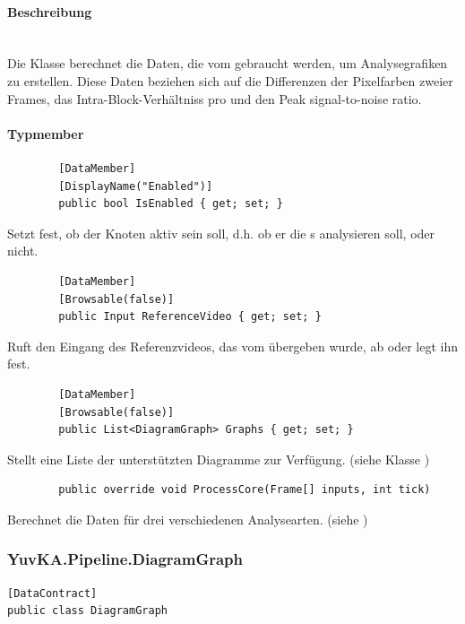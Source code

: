 \paragraph{Beschreibung}~\\
Die Klasse  berechnet die Daten, die vom  gebraucht werden, um Analysegrafiken zu erstellen. Diese Daten beziehen sich auf die Differenzen der Pixelfarben zweier Frames, das Intra-Block-Verhältniss pro  und den Peak signal-to-noise ratio.

\paragraph{Typmember}
\begin{itemize}

	\begin{verbatim}
		[DataMember]
		[DisplayName("Enabled")]
		public bool IsEnabled { get; set; }
	\end{verbatim}
	Setzt fest, ob der Knoten aktiv sein soll, d.h. ob er die s analysieren soll, oder nicht.
	
	\begin{verbatim}
		[DataMember]
		[Browsable(false)]
		public Input ReferenceVideo { get; set; }
	\end{verbatim}
	Ruft den Eingang des Referenzvideos, das vom  übergeben wurde, ab oder legt ihn fest.

	\begin{verbatim}
		[DataMember]
		[Browsable(false)]
		public List<DiagramGraph> Graphs { get; set; }
	\end{verbatim}
	Stellt eine Liste der unterstützten Diagramme zur Verfügung. (siehe Klasse )
	
	\begin{verbatim}
		public override void ProcessCore(Frame[] inputs, int tick)
	\end{verbatim}
	Berechnet die Daten für drei verschiedenen Analysearten. (siehe )
	
\end{itemize}

\subsubsection{YuvKA.Pipeline.DiagramGraph}
\begin{verbatim}
[DataContract]
public class DiagramGraph
\end{verbatim}

